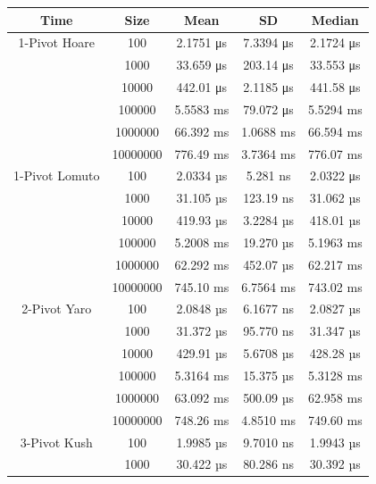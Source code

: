\documentclass{article}
\begin{document}
\begin{center}
    \small
    \begin{tabular}{ |c c | c c c| }
        \hline
        Time            & Size     & Mean         & SD          & Median \\
        \hline
        1-Pivot Hoare   & 100      & 2.1751 μs    & 7.3394 μs   & 2.1724 μs \\
                        & 1000     & 33.659 μs    & 203.14 μs   & 33.553 μs \\
                        & 10000    & 442.01 μs    & 2.1185 μs   & 441.58 μs \\
                        & 100000   & 5.5583 ms    & 79.072 μs   & 5.5294 ms \\
                        & 1000000  & 66.392 ms    & 1.0688 ms   & 66.594 ms \\
                        & 10000000 & 776.49 ms    & 3.7364 ms   & 776.07 ms \\
        \hline
        1-Pivot Lomuto  & 100      & 2.0334 µs    & 5.281 ns    & 2.0322 μs \\
                        & 1000     & 31.105 µs    & 123.19 ns   & 31.062 µs \\
                        & 10000    & 419.93 µs    & 3.2284 µs   & 418.01 µs \\
                        & 100000   & 5.2008 ms    & 19.270 µs   & 5.1963 ms \\
                        & 1000000  & 62.292 ms    & 452.07 µs   & 62.217 ms \\
                        & 10000000 & 745.10 ms    & 6.7564 ms   & 743.02 ms \\
        \hline
        2-Pivot Yaro    & 100      & 2.0848 µs    & 6.1677 ns   & 2.0827 µs \\
                        & 1000     & 31.372 µs    & 95.770 ns   & 31.347 µs \\
                        & 10000    & 429.91 µs    & 5.6708 µs   & 428.28 µs \\
                        & 100000   & 5.3164 ms    & 15.375 µs   & 5.3128 ms \\
                        & 1000000  & 63.092 ms    & 500.09 µs   & 62.958 ms \\
                        & 10000000 & 748.26 ms    & 4.8510 ms   & 749.60 ms \\
        \hline
        3-Pivot Kush    & 100      & 1.9985 µs    & 9.7010 ns   & 1.9943 µs \\
                        & 1000     & 30.422 µs    & 80.286 ns   & 30.392 µs \\

\end{tabular}
\end{center}
\end{document}

